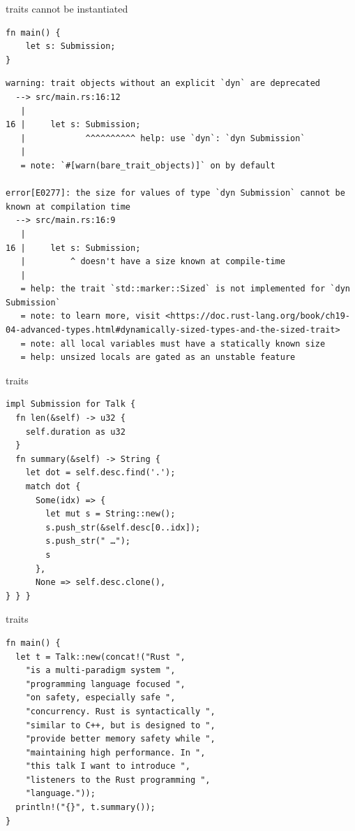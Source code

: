 \documentclass{beamer}
\begin{document}
\begin{frame}[fragile]{traits cannot be instantiated}
  \begin{verbatim}
fn main() {
    let s: Submission;
}
  \end{verbatim}

  \begin{verbatim}
warning: trait objects without an explicit `dyn` are deprecated
  --> src/main.rs:16:12
   |
16 |     let s: Submission;
   |            ^^^^^^^^^^ help: use `dyn`: `dyn Submission`
   |
   = note: `#[warn(bare_trait_objects)]` on by default

error[E0277]: the size for values of type `dyn Submission` cannot be known at compilation time
  --> src/main.rs:16:9
   |
16 |     let s: Submission;
   |         ^ doesn't have a size known at compile-time
   |
   = help: the trait `std::marker::Sized` is not implemented for `dyn Submission`
   = note: to learn more, visit <https://doc.rust-lang.org/book/ch19-04-advanced-types.html#dynamically-sized-types-and-the-sized-trait>
   = note: all local variables must have a statically known size
   = help: unsized locals are gated as an unstable feature
   \end{verbatim}
\end{frame}

\begin{frame}[fragile]{traits}
  \begin{verbatim}
impl Submission for Talk {
  fn len(&self) -> u32 {
    self.duration as u32
  }
  fn summary(&self) -> String {
    let dot = self.desc.find('.');
    match dot {
      Some(idx) => {
        let mut s = String::new();
        s.push_str(&self.desc[0..idx]);
        s.push_str(" …");
        s
      },
      None => self.desc.clone(),
} } }
  \end{verbatim}
\end{frame}

\begin{frame}[fragile]{traits}
  \begin{verbatim}
fn main() {
  let t = Talk::new(concat!("Rust ",
    "is a multi-paradigm system ",
    "programming language focused ",
    "on safety, especially safe ",
    "concurrency. Rust is syntactically ",
    "similar to C++, but is designed to ",
    "provide better memory safety while ",
    "maintaining high performance. In ",
    "this talk I want to introduce ",
    "listeners to the Rust programming ",
    "language."));
  println!("{}", t.summary());
}
  \end{verbatim}
\end{frame}
\end{document}
